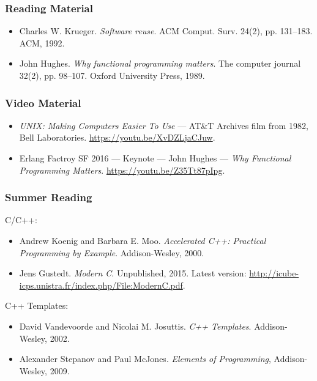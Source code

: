 \begin{frame}

\frametitle{Reading Material}

\footnotesize

\begin{itemize}

\item Charles W. Krueger. \emph{Software reuse}. ACM Comput. Surv. 24(2),
pp. 131--183. ACM, 1992.

\item John Hughes. \emph{Why functional programming matters}. The computer
journal 32(2), pp. 98--107. Oxford University Press, 1989.

\end{itemize}

\end{frame}


\begin{frame}

\frametitle{Video Material}

\footnotesize

\begin{itemize}

\item \emph{UNIX: Making Computers Easier To Use} --- AT\&T Archives film from
1982, Bell Laboratories. \url{https://youtu.be/XvDZLjaCJuw}.

\item Erlang Factroy SF 2016 --- Keynote --- John Hughes --- \emph{Why
Functional Programming Matters}. \url{https://youtu.be/Z35Tt87pIpg}.

\end{itemize}

\end{frame}


\begin{frame}

\frametitle{Summer Reading}

\footnotesize

C/C++:

\begin{itemize}

\item Andrew Koenig and Barbara E. Moo. \emph{Accelerated C++: Practical
Programming by Example}. Addison-Wesley, 2000.

\item Jens Gustedt. \emph{Modern C}. Unpublished, 2015. Latest version:
\url{http://icube-icps.unistra.fr/index.php/File:ModernC.pdf}.

\end{itemize}

C++ Templates:

\begin{itemize}

\item David Vandevoorde and Nicolai M. Josuttis. \emph{C++ Templates}.
Addison-Wesley, 2002.

\item Alexander Stepanov and Paul McJones. \emph{Elements of Programming},
Addison-Wesley, 2009.

\end{itemize}

\end{frame}
